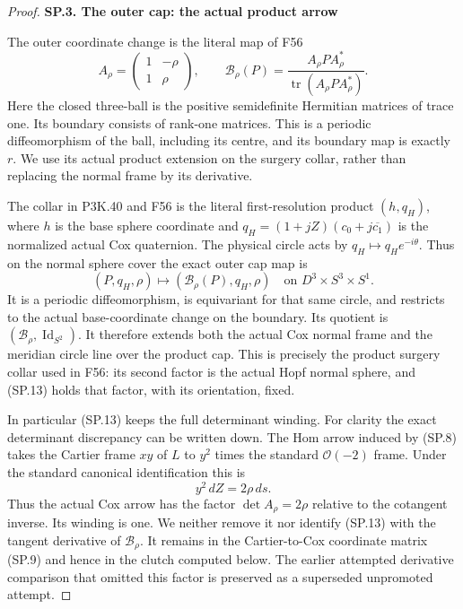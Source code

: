 \begin{proof}
\par

\medskip\noindent\textbf{SP.3. The outer cap: the actual product arrow}

\par\nobreak

The outer coordinate change is the literal map of F56
\[
 A_\rho=\begin{pmatrix}1&-\rho\\1&\rho\end{pmatrix},
 \qquad
 \mathcal B_\rho(P)=
       \frac{A_\rho P A_\rho^*}{\operatorname{tr}(A_\rho P A_\rho^*)}.
                                                               \tag{SP.12}
\]
Here the closed three-ball is the positive semidefinite Hermitian
matrices of trace one. Its boundary consists of rank-one matrices.
This is a periodic diffeomorphism of the ball, including its centre,
and its boundary map is exactly \(r\). We use its actual product
extension on the surgery collar, rather than replacing the normal
frame by its derivative.

The collar in P3K.40 and F56 is the literal first-resolution product
\((h,q_H)\), where \(h\) is the base sphere coordinate and
\(q_H=(1+jZ)(c_0+j\overline{c_1})\) is the normalized actual
Cox quaternion. The physical circle acts by
\(q_H\mapsto q_H e^{-i\theta}\). Thus on the normal sphere
cover the exact outer cap map is
\[
 (P,q_H,\rho)\longmapsto
                  (\mathcal B_\rho(P),q_H,\rho)
 \quad\text{on }D^3\times S^3\times S^1.                 \tag{SP.13}
\]
It is a periodic diffeomorphism, is equivariant for that same circle,
and restricts to the actual base-coordinate change on the boundary.
Its quotient is
\((\mathcal B_\rho,\operatorname{Id}_{S^2})\). It therefore
extends both the actual Cox normal frame and the meridian circle
line over the product cap. This is precisely the product surgery
collar used in F56: its second factor is the actual Hopf normal
sphere, and (SP.13) holds that factor, with its orientation, fixed.

In particular (SP.13) keeps the full determinant winding. For
clarity the exact determinant discrepancy can be written down.
The Hom arrow induced by (SP.8) takes the Cartier frame \(xy\)
of \(L\) to \(y^2\) times the standard \(\mathcal O(-2)\)
frame. Under the standard canonical identification this is
\[
                  y^2\,dZ=2\rho\,ds.                    \tag{SP.14}
\]
Thus the actual Cox arrow has the factor
\(\det A_\rho=2\rho\) relative to the cotangent inverse.
Its winding is one. We neither remove it nor identify (SP.13) with
the tangent derivative of \(\mathcal B_\rho\). It remains in
the Cartier-to-Cox coordinate matrix (SP.9) and hence in the clutch
computed below. The earlier attempted derivative comparison that
omitted this factor is preserved as a superseded unpromoted attempt.


\end{proof}
